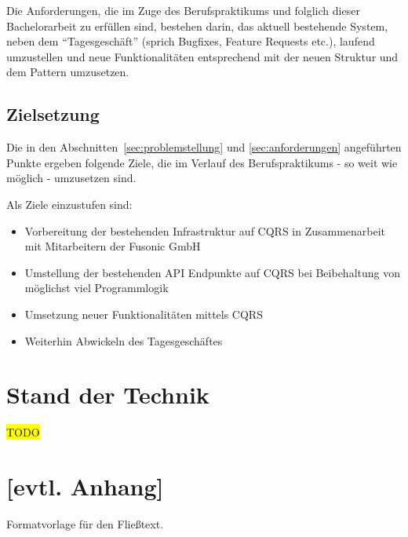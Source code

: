 \documentclass[a4paper,12pt,twoside]{scrreprt}
\begin{document}
\medskip

Die Anforderungen, die im Zuge des Berufspraktikums und folglich dieser Bachelorarbeit zu erfüllen sind, bestehen darin, das aktuell bestehende System, neben dem \enquote{Tagesgeschäft} (sprich Bugfixes, Feature Requests etc.), laufend umzustellen und neue Funktionalitäten entsprechend mit der neuen Struktur und dem Pattern umzusetzen.

\section{Zielsetzung}
\label{sec:zielsetzung}
Die in den Abschnitten~\ref{sec:problemstellung} und \ref{sec:anforderungen} angeführten Punkte ergeben folgende Ziele, die im Verlauf des Berufspraktikums - so weit wie möglich - umzusetzen sind.

\smallskip

\noindent
Als Ziele einzustufen sind:
\begin{itemize}
    \item Vorbereitung der bestehenden Infrastruktur auf CQRS in Zusammenarbeit mit Mitarbeitern der Fusonic GmbH
    \item Umstellung der bestehenden API Endpunkte auf CQRS bei Beibehaltung von möglichst viel Programmlogik
    \item Umsetzung neuer Funktionalitäten mittels CQRS
    \item Weiterhin Abwickeln des Tagesgeschäftes
\end{itemize}

\chapter{Stand der Technik}
\label{chap:stand-technik}

\colorbox{yellow}{TODO}

\clearpage
{}
{}
\printbibliography

\chapter*{[evtl. Anhang]}  %
Formatvorlage für den Fließtext.
\end{document}

